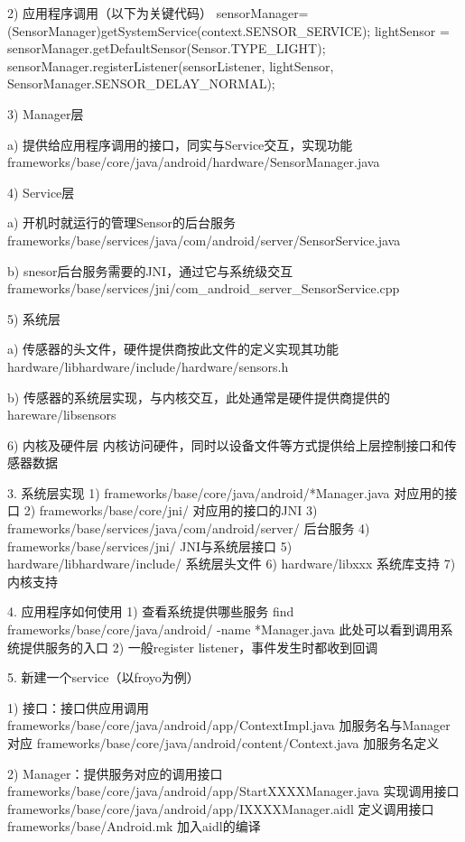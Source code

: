 \documentclass{book}
\begin{document}
\begin{CJK}{UTF8}{gbsn}
{2)         应用程序调用（以下为关键代码）
sensorManager=(SensorManager)getSystemService(context.SENSOR_SERVICE);
lightSensor = sensorManager.getDefaultSensor(Sensor.TYPE_LIGHT);
sensorManager.registerListener(sensorListener, lightSensor, SensorManager.SENSOR_DELAY_NORMAL);

3)         Manager层

a)          提供给应用程序调用的接口，同实与Service交互，实现功能
frameworks/base/core/java/android/hardware/SensorManager.java

4)         Service层

a)          开机时就运行的管理Sensor的后台服务
frameworks/base/services/java/com/android/server/SensorService.java

b)         snesor后台服务需要的JNI，通过它与系统级交互
frameworks/base/services/jni/com_android_server_SensorService.cpp

5)         系统层

a)          传感器的头文件，硬件提供商按此文件的定义实现其功能
hardware/libhardware/include/hardware/sensors.h

b)         传感器的系统层实现，与内核交互，此处通常是硬件提供商提供的
hareware/libsensors

6)         内核及硬件层
内核访问硬件，同时以设备文件等方式提供给上层控制接口和传感器数据

3.     系统层实现
1)         frameworks/base/core/java/android/*Manager.java     对应用的接口
2)         frameworks/base/core/jni/                                                     对应用的接口的JNI
3)         frameworks/base/services/java/com/android/server/    后台服务
4)         frameworks/base/services/jni/                                                        JNI与系统层接口
5)         hardware/libhardware/include/                                              系统层头文件
6)         hardware/libxxx                                                                     系统库支持
7)         内核支持

4.     应用程序如何使用
1)         查看系统提供哪些服务
find frameworks/base/core/java/android/ -name *Manager.java
此处可以看到调用系统提供服务的入口
2)         一般register listener，事件发生时都收到回调

5.    新建一个service（以froyo为例）

1)         接口：接口供应用调用
frameworks/base/core/java/android/app/ContextImpl.java  加服务名与Manager对应
frameworks/base/core/java/android/content/Context.java    加服务名定义

2)         Manager：提供服务对应的调用接口
frameworks/base/core/java/android/app/StartXXXXManager.java        实现调用接口
frameworks/base/core/java/android/app/IXXXXManager.aidl      定义调用接口
frameworks/base/Android.mk         加入aidl的编译

}
\end{CJK}
\end{document}
